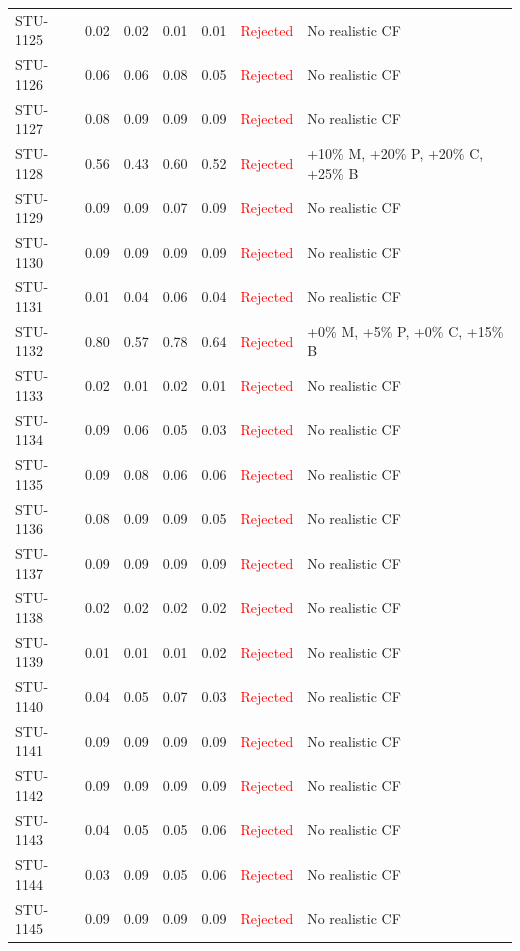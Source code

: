 \begin{longtable}{l c c c c | c | l}
STU-1125 & 0.02 & 0.02 & 0.01 & 0.01 & \textcolor{red}{Rejected} & No realistic CF \\
STU-1126 & 0.06 & 0.06 & 0.08 & 0.05 & \textcolor{red}{Rejected} & No realistic CF \\
STU-1127 & 0.08 & 0.09 & 0.09 & 0.09 & \textcolor{red}{Rejected} & No realistic CF \\
STU-1128 & 0.56 & 0.43 & 0.60 & 0.52 & \textcolor{red}{Rejected} & +10\% M, +20\% P, +20\% C, +25\% B \\
STU-1129 & 0.09 & 0.09 & 0.07 & 0.09 & \textcolor{red}{Rejected} & No realistic CF \\
STU-1130 & 0.09 & 0.09 & 0.09 & 0.09 & \textcolor{red}{Rejected} & No realistic CF \\
STU-1131 & 0.01 & 0.04 & 0.06 & 0.04 & \textcolor{red}{Rejected} & No realistic CF \\
STU-1132 & 0.80 & 0.57 & 0.78 & 0.64 & \textcolor{red}{Rejected} & +0\% M, +5\% P, +0\% C, +15\% B \\
STU-1133 & 0.02 & 0.01 & 0.02 & 0.01 & \textcolor{red}{Rejected} & No realistic CF \\
STU-1134 & 0.09 & 0.06 & 0.05 & 0.03 & \textcolor{red}{Rejected} & No realistic CF \\
STU-1135 & 0.09 & 0.08 & 0.06 & 0.06 & \textcolor{red}{Rejected} & No realistic CF \\
STU-1136 & 0.08 & 0.09 & 0.09 & 0.05 & \textcolor{red}{Rejected} & No realistic CF \\
STU-1137 & 0.09 & 0.09 & 0.09 & 0.09 & \textcolor{red}{Rejected} & No realistic CF \\
STU-1138 & 0.02 & 0.02 & 0.02 & 0.02 & \textcolor{red}{Rejected} & No realistic CF \\
STU-1139 & 0.01 & 0.01 & 0.01 & 0.02 & \textcolor{red}{Rejected} & No realistic CF \\
STU-1140 & 0.04 & 0.05 & 0.07 & 0.03 & \textcolor{red}{Rejected} & No realistic CF \\
STU-1141 & 0.09 & 0.09 & 0.09 & 0.09 & \textcolor{red}{Rejected} & No realistic CF \\
STU-1142 & 0.09 & 0.09 & 0.09 & 0.09 & \textcolor{red}{Rejected} & No realistic CF \\
STU-1143 & 0.04 & 0.05 & 0.05 & 0.06 & \textcolor{red}{Rejected} & No realistic CF \\
STU-1144 & 0.03 & 0.09 & 0.05 & 0.06 & \textcolor{red}{Rejected} & No realistic CF \\
STU-1145 & 0.09 & 0.09 & 0.09 & 0.09 & \textcolor{red}{Rejected} & No realistic CF \\

\end{longtable}
